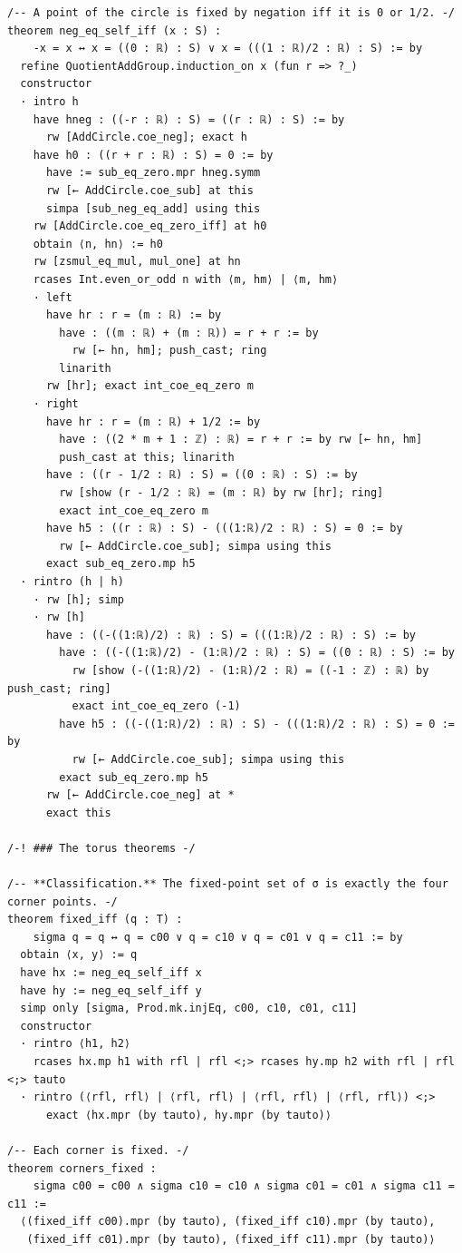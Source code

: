 \documentclass[11pt,a4paper]{article}
\theoremstyle{plain}
\theoremstyle{definition}
\theoremstyle{remark}
\begin{document}
\begin{Verbatim}[fontsize=\footnotesize,breaklines=true,breakanywhere=true,formatcom=\leanmono]
/-- A point of the circle is fixed by negation iff it is 0 or 1/2. -/
theorem neg_eq_self_iff (x : S) :
    -x = x ↔ x = ((0 : ℝ) : S) ∨ x = (((1 : ℝ)/2 : ℝ) : S) := by
  refine QuotientAddGroup.induction_on x (fun r => ?_)
  constructor
  · intro h
    have hneg : ((-r : ℝ) : S) = ((r : ℝ) : S) := by
      rw [AddCircle.coe_neg]; exact h
    have h0 : ((r + r : ℝ) : S) = 0 := by
      have := sub_eq_zero.mpr hneg.symm
      rw [← AddCircle.coe_sub] at this
      simpa [sub_neg_eq_add] using this
    rw [AddCircle.coe_eq_zero_iff] at h0
    obtain ⟨n, hn⟩ := h0
    rw [zsmul_eq_mul, mul_one] at hn
    rcases Int.even_or_odd n with ⟨m, hm⟩ | ⟨m, hm⟩
    · left
      have hr : r = (m : ℝ) := by
        have : ((m : ℝ) + (m : ℝ)) = r + r := by
          rw [← hn, hm]; push_cast; ring
        linarith
      rw [hr]; exact int_coe_eq_zero m
    · right
      have hr : r = (m : ℝ) + 1/2 := by
        have : ((2 * m + 1 : ℤ) : ℝ) = r + r := by rw [← hn, hm]
        push_cast at this; linarith
      have : ((r - 1/2 : ℝ) : S) = ((0 : ℝ) : S) := by
        rw [show (r - 1/2 : ℝ) = (m : ℝ) by rw [hr]; ring]
        exact int_coe_eq_zero m
      have h5 : ((r : ℝ) : S) - (((1:ℝ)/2 : ℝ) : S) = 0 := by
        rw [← AddCircle.coe_sub]; simpa using this
      exact sub_eq_zero.mp h5
  · rintro (h | h)
    · rw [h]; simp
    · rw [h]
      have : ((-((1:ℝ)/2) : ℝ) : S) = (((1:ℝ)/2 : ℝ) : S) := by
        have : ((-((1:ℝ)/2) - (1:ℝ)/2 : ℝ) : S) = ((0 : ℝ) : S) := by
          rw [show (-((1:ℝ)/2) - (1:ℝ)/2 : ℝ) = ((-1 : ℤ) : ℝ) by push_cast; ring]
          exact int_coe_eq_zero (-1)
        have h5 : ((-((1:ℝ)/2) : ℝ) : S) - (((1:ℝ)/2 : ℝ) : S) = 0 := by
          rw [← AddCircle.coe_sub]; simpa using this
        exact sub_eq_zero.mp h5
      rw [← AddCircle.coe_neg] at *
      exact this

/-! ### The torus theorems -/

/-- **Classification.** The fixed-point set of σ is exactly the four
corner points. -/
theorem fixed_iff (q : T) :
    sigma q = q ↔ q = c00 ∨ q = c10 ∨ q = c01 ∨ q = c11 := by
  obtain ⟨x, y⟩ := q
  have hx := neg_eq_self_iff x
  have hy := neg_eq_self_iff y
  simp only [sigma, Prod.mk.injEq, c00, c10, c01, c11]
  constructor
  · rintro ⟨h1, h2⟩
    rcases hx.mp h1 with rfl | rfl <;> rcases hy.mp h2 with rfl | rfl <;> tauto
  · rintro (⟨rfl, rfl⟩ | ⟨rfl, rfl⟩ | ⟨rfl, rfl⟩ | ⟨rfl, rfl⟩) <;>
      exact ⟨hx.mpr (by tauto), hy.mpr (by tauto)⟩

/-- Each corner is fixed. -/
theorem corners_fixed :
    sigma c00 = c00 ∧ sigma c10 = c10 ∧ sigma c01 = c01 ∧ sigma c11 = c11 :=
  ⟨(fixed_iff c00).mpr (by tauto), (fixed_iff c10).mpr (by tauto),
   (fixed_iff c01).mpr (by tauto), (fixed_iff c11).mpr (by tauto)⟩


\end{Verbatim}
\end{document}
